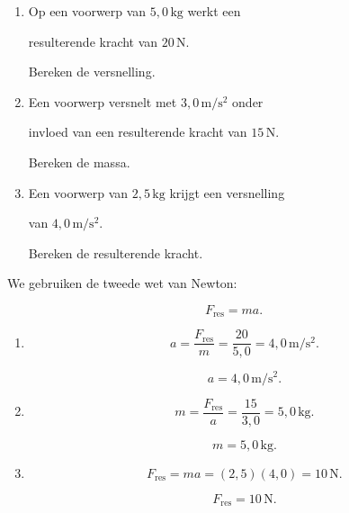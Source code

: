 \documentclass{ximera}
\begin{document}
\begin{oefening}{\oefB\ESS}

\begin{enumerate}

 \item Op een voorwerp van $5{,}0\,\mathrm{kg}$ werkt een

    resulterende kracht van $20\,\mathrm N$.

    Bereken de versnelling.

 \item Een voorwerp versnelt met $3{,}0\,\mathrm{m/s^2}$ onder

    invloed van een resulterende kracht van $15\,\mathrm N$.

    Bereken de massa.

 \item Een voorwerp van $2{,}5\,\mathrm{kg}$ krijgt een versnelling

    van $4{,}0\,\mathrm{m/s^2}$.

    Bereken de resulterende kracht.

\end{enumerate}


\begin{oplossing}

We gebruiken de tweede wet van Newton:

\[F_{\mathrm{res}}=ma.\]

\begin{enumerate}

  \item

  \[a=\frac{F_{\mathrm{res}}}{m} =\frac{20}{5{,}0} =4{,}0\,\mathrm{m/s^2}.\]

  \[\boxed{a=4{,}0\,\mathrm{m/s^2}}.\]

  \item

  \[m=\frac{F_{\mathrm{res}}}{a} =\frac{15}{3{,}0} =5{,}0\,\mathrm{kg}.\]

  \[\boxed{m=5{,}0\,\mathrm{kg}}.\]

  \item

  \[F_{\mathrm{res}}=ma =(2{,}5)(4{,}0) =10\,\mathrm N.\]

  \[\boxed{F_{\mathrm{res}}=10\,\mathrm N}.\]

\end{enumerate}

\end{oplossing}

\end{oefening}
\end{document}
